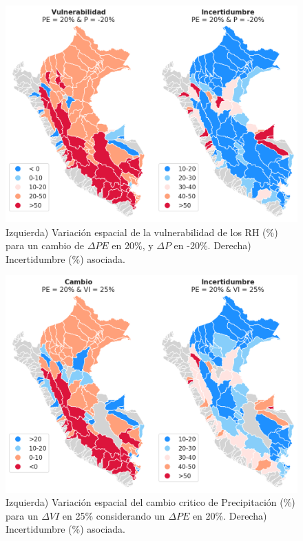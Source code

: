 \begin{figure}[htb]
	\includegraphics[scale=.8]{Images/13_VI_f(PE,P).png}
	\centering
	\caption{Izquierda) Variación espacial de la vulnerabilidad de los RH (\%) para un cambio de $\Delta PE$ en 20\%, y $\Delta P$ en -20\%. Derecha) Incertidumbre (\%) asociada.}
	\label{fig:13_VI_f(PE,P)}
\end{figure}

\begin{figure}[htb]
	\includegraphics[scale=.7]{Images/14_P_f(PE,VI).png}
	\centering
	\caption{Izquierda) Variación espacial del cambio critico de Precipitación (\%) para un  $\Delta VI$ en 25\% considerando un $\Delta PE$ en 20\%. Derecha) Incertidumbre (\%) asociada.}
	\label{fig:14_P_f(PE,VI)}
\end{figure}

